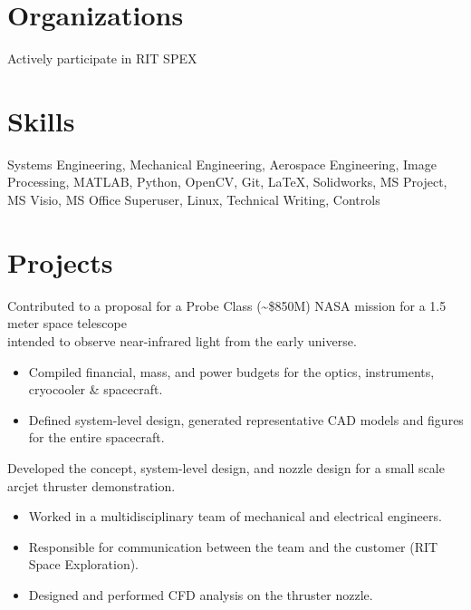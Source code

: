 \documentclass[10pt,final,sans]{resume}
\begin{document}
\section{Organizations}
Actively participate in RIT SPEX

\section{Skills}
Systems Engineering, Mechanical Engineering, Aerospace Engineering, Image Processing, MATLAB, Python, OpenCV, Git, {\textrm \LaTeX}, Solidworks, MS Project, MS Visio, MS Office Superuser, Linux, Technical Writing, Controls

\break
\section{Projects}
Contributed to a proposal for a Probe Class (\textasciitilde\$850M) NASA mission for a 1.5 meter space telescope \\
intended to observe near-infrared light from the early
universe.
\begin{itemize}
  \item Compiled financial, mass, and power budgets for the optics, instruments,
    cryocooler \& spacecraft.
  \item Defined system-level design, generated representative CAD models and
    figures for the entire spacecraft.
\end{itemize}

Developed the concept, system-level design, and nozzle design for a small scale arcjet thruster demonstration. 
\begin{itemize}
  \item Worked in a multidisciplinary team of mechanical and electrical engineers.
  \item Responsible for communication between the team and the customer (RIT Space Exploration).
  \item Designed and performed CFD analysis on the thruster nozzle.
\end{itemize}
\end{document}
